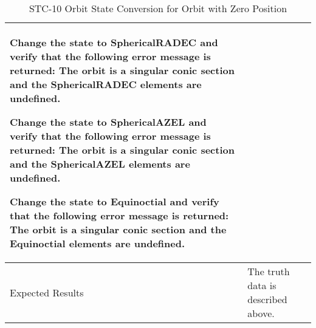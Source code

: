 \begin{table}[htbp!]
\begin{tabular}{|p{1.05 in} |p{4.75 in} |}
\begin{compactenum}
             \item Change the state to SphericalRADEC and verify that the following error message is returned: The orbit is a singular conic section and the SphericalRADEC elements are undefined.
             \item Change the state to SphericalAZEL and verify that the following error message is returned: The orbit is a singular conic section and the SphericalAZEL elements are undefined.
             \item Change the state to Equinoctial and verify that the following error message is returned:
                   The orbit is a singular conic section and the Equinoctial elements are undefined.
         \end{compactenum}
         \\ \hline
         Expected Results & The truth data is described above.\\
      \hline
      \end{tabular}
      \label{Table:STC-10}
      \caption{STC-10 Orbit State Conversion for Orbit with Zero Position}
\end{table} 